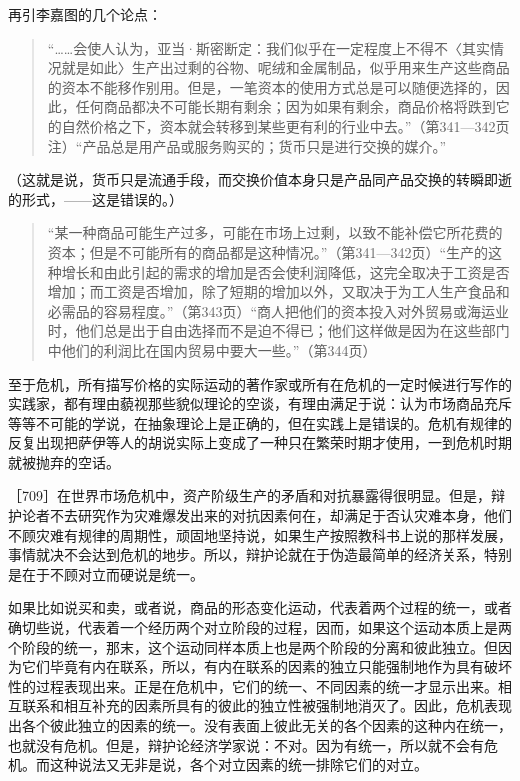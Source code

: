 
再引李嘉图的几个论点：

\begin{quote}{“……会使人认为，亚当·斯密断定：我们似乎在一定程度上不得不〈其实情况就是如此〉生产出过剩的谷物、呢绒和金属制品，似乎用来生产这些商品的资本不能移作别用。但是，一笔资本的使用方式总是可以随便选择的，因此，任何商品都决不可能长期有剩余；因为如果有剩余，商品价格将跌到它的自然价格之下，资本就会转移到某些更有利的行业中去。”（第341—342页注）“产品总是用产品或服务购买的；货币只是进行交换的媒介。”}\end{quote}

（这就是说，货币只是流通手段，而交换价值本身只是产品同产品交换的转瞬即逝的形式，——这是错误的。）

\begin{quote}{“某一种商品可能生产过多，可能在市场上过剩，以致不能补偿它所花费的资本；但是不可能所有的商品都是这种情况。”（第341—342页）“生产的这种增长和由此引起的需求的增加是否会使利润降低，这完全取决于工资是否增加；而工资是否增加，除了短期的增加以外，又取决于为工人生产食品和必需品的容易程度。”（第343页）“商人把他们的资本投入对外贸易或海运业时，他们总是出于自由选择而不是迫不得已；他们这样做是因为在这些部门中他们的利润比在国内贸易中要大一些。”（第344页）}\end{quote}

至于危机，所有描写价格的实际运动的著作家或所有在危机的一定时候进行写作的实践家，都有理由藐视那些貌似理论的空谈，有理由满足于说：认为市场商品充斥等等不可能的学说，在抽象理论上是正确的，但在实践上是错误的。危机有规律的反复出现把萨伊等人的胡说实际上变成了一种只在繁荣时期才使用，一到危机时期就被抛弃的空话。

［709］在世界市场危机中，资产阶级生产的矛盾和对抗暴露得很明显。但是，辩护论者不去研究作为灾难爆发出来的对抗因素何在，却满足于否认灾难本身，他们不顾灾难有规律的周期性，顽固地坚持说，如果生产按照教科书上说的那样发展，事情就决不会达到危机的地步。所以，辩护论就在于伪造最简单的经济关系，特别是在于不顾对立而硬说是统一。

如果比如说买和卖，或者说，商品的形态变化运动，代表着两个过程的统一，或者确切些说，代表着一个经历两个对立阶段的过程，因而，如果这个运动本质上是两个阶段的统一，那末，这个运动同样本质上也是两个阶段的分离和彼此独立。但因为它们毕竟有内在联系，所以，有内在联系的因素的独立只能强制地作为具有破坏性的过程表现出来。正是在危机中，它们的统一、不同因素的统一才显示出来。相互联系和相互补充的因素所具有的彼此的独立性被强制地消灭了。因此，危机表现出各个彼此独立的因素的统一。没有表面上彼此无关的各个因素的这种内在统一，也就没有危机。但是，辩护论经济学家说：不对。因为有统一，所以就不会有危机。而这种说法又无非是说，各个对立因素的统一排除它们的对立。

